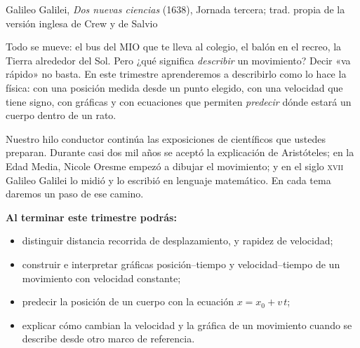 \documentclass[11pt]{article}
\begin{document}
\encabezado

{Galileo Galilei, \emph{Dos nuevas ciencias} (1638), Jornada tercera; trad. propia de la
versión inglesa de Crew y de Salvio}


Todo se mueve: el bus del MIO que te lleva al colegio, el balón en el recreo, la Tierra
alrededor del Sol. Pero ¿qué significa \emph{describir} un movimiento? Decir «va rápido» no
basta. En este trimestre aprenderemos a describirlo como lo hace la física: con una posición
medida desde un punto elegido, con una velocidad que tiene signo, con gráficas y con
ecuaciones que permiten \emph{predecir} dónde estará un cuerpo dentro de un rato.

Nuestro hilo conductor continúa las exposiciones de científicos que ustedes preparan. Durante
casi dos mil años se aceptó la explicación de Aristóteles; en la Edad Media, Nicole Oresme
empezó a dibujar el movimiento; y en el siglo \textsc{xvii} Galileo Galilei lo midió y lo
escribió en lenguaje matemático. En cada tema daremos un paso de ese camino.

\textbf{Al terminar este trimestre podrás:}
\begin{itemize}
  \item distinguir distancia recorrida de desplazamiento, y rapidez de velocidad;
  \item construir e interpretar gráficas posición--tiempo y velocidad--tiempo de un
        movimiento con velocidad constante;
  \item predecir la posición de un cuerpo con la ecuación $x = x_0 + v\,t$;
  \item explicar cómo cambian la velocidad y la gráfica de un movimiento cuando se describe
        desde otro marco de referencia.
\end{itemize}
\end{document}
